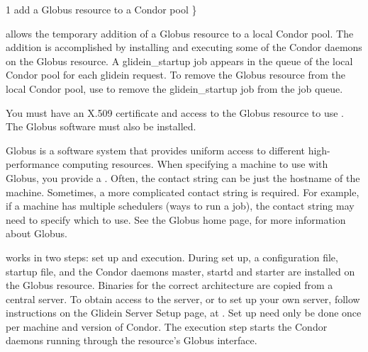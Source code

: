 \begin{ManPage}{\label{man-condor-glidein}}{1}
{add a Globus resource to a Condor pool}
\Synopsis {}
 \} \Bar {}


\Description

 allows the temporary addition of a Globus resource to
a local Condor pool.
The addition is accomplished by installing and executing some of the Condor
daemons on the Globus resource.
A glidein\_startup job appears in the queue of the local
Condor pool for each glidein request.
To remove the Globus resource from the local Condor pool,
use  to remove the glidein\_startup job from
the job queue.

You must have an X.509 certificate and access
to the Globus resource to use .
The Globus software must also be installed.

Globus is a software system that provides uniform access to
different high-performance computing resources.
When specifying a machine to use with Globus,
you provide a .
Often, the contact string can be just the hostname of the machine.
Sometimes, a more complicated contact string is required.
For example, if a machine has multiple schedulers (ways to run a job),
the contact string may need to specify which to use.
See the Globus home page,  for more
information about Globus.

 works in two steps: set up and execution.
During set up, a configuration file, startup file, and the Condor daemons
master, startd and starter are installed on the Globus
resource.
Binaries for the correct architecture are copied from a central server.
To obtain access to the server,
or to set up your own server, follow
instructions on the Glidein Server Setup page,
at .
Set up need only be done once per machine and version of Condor.
The execution step starts the Condor daemons running through
the resource's Globus interface.


\end{ManPage}
